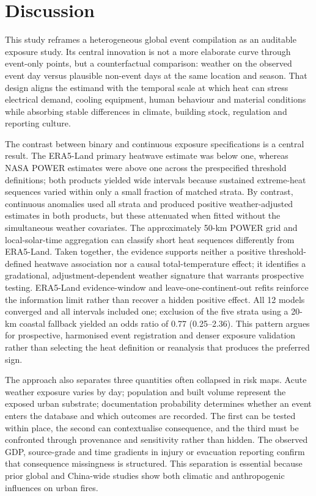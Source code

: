 \documentclass[11pt]{article}
\begin{document}
\section*{Discussion}
This study reframes a heterogeneous global event compilation as an auditable exposure study. Its central innovation is not a more elaborate curve through event-only points, but a counterfactual comparison: weather on the observed event day versus plausible non-event days at the same location and season. That design aligns the estimand with the temporal scale at which heat can stress electrical demand, cooling equipment, human behaviour and material conditions while absorbing stable differences in climate, building stock, regulation and reporting culture.

The contrast between binary and continuous exposure specifications is a central result. The ERA5-Land primary heatwave estimate was below one, whereas NASA POWER estimates were above one across the prespecified threshold definitions; both products yielded wide intervals because sustained extreme-heat sequences varied within only a small fraction of matched strata. By contrast, continuous anomalies used all strata and produced positive weather-adjusted estimates in both products, but these attenuated when fitted without the simultaneous weather covariates. The approximately 50-km POWER grid and local-solar-time aggregation can classify short heat sequences differently from ERA5-Land. Taken together, the evidence supports neither a positive threshold-defined heatwave association nor a causal total-temperature effect; it identifies a gradational, adjustment-dependent weather signature that warrants prospective testing.
ERA5-Land evidence-window and leave-one-continent-out refits reinforce the information limit rather than recover a hidden positive effect. All 12 models converged and all intervals included one; exclusion of the five strata using a 20-km coastal fallback yielded an odds ratio of 0.77 (0.25--2.36). This pattern argues for prospective, harmonised event registration and denser exposure validation rather than selecting the heat definition or reanalysis that produces the preferred sign.

The approach also separates three quantities often collapsed in risk maps. Acute weather exposure varies by day; population and built volume represent the exposed urban substrate; documentation probability determines whether an event enters the database and which outcomes are recorded. The first can be tested within place, the second can contextualise consequence, and the third must be confronted through provenance and sensitivity rather than hidden. The observed GDP, source-grade and time gradients in injury or evacuation reporting confirm that consequence missingness is structured. This separation is essential because prior global and China-wide studies show both climatic and anthropogenic influences on urban fires\citep{Shi2025,Yao2024}.
\end{document}

